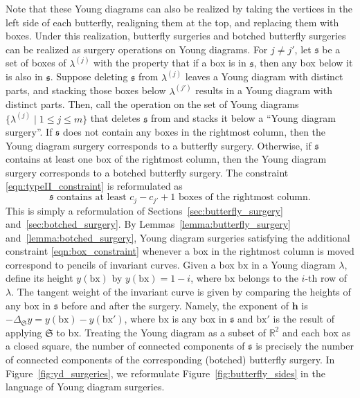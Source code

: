 \documentclass[pdftex]{sigma}
\numberwithin{equation}{section}
\newcommand{\RR}{\mathbb R}
\newcommand{\hb}{\mathbf h}
\newcommand{\site}{\mathfrak s}
\newcommand{\surgery}{\mathfrak S}
\newcommand{\bx}{\mathrm{bx}}
\begin{document}
Note that these Young diagrams can also be realized by taking the vertices in the left side of each butterfly, realigning them at the top, and replacing them with boxes. Under this realization, butterfly surgeries and botched butterfly surgeries can be realized as surgery operations on Young diagrams. For $j\neq j'$, let $\site$ be a set of boxes of $\lambda^{(j)}$ with the property that if a box is in $\site$, then any box below it is also in $\site$. Suppose deleting $\site$ from $\lambda^{(j)}$ leaves a Young diagram with distinct parts, and stacking those boxes below $\lambda^{(j')}$ results in a Young diagram with distinct parts. Then, call the operation on the set of Young diagrams $\big\{\lambda^{(j)} \mid 1\leq j \leq m\big\}$ that deletes $\site$ from  and stacks it below  a ``Young diagram surgery''. If $\site$ does not contain any boxes in the rightmost column, then the Young diagram surgery corresponds to a butterfly surgery. Otherwise, if $\site$ contains at least one box of the rightmost column, then the Young diagram surgery corresponds to a botched butterfly surgery. The constraint \eqref{eqn:typeII_constraint} is reformulated as
\begin{equation} \label{eqn:box_constraint}
\site\text{ contains at least }c_j - c_{j'} + 1\text{ boxes of the rightmost column.}
\end{equation}
This is simply a reformulation of Sections~\ref{sec:butterfly_surgery} and~\ref{sec:botched_surgery}. By Lemmas~\ref{lemma:butterfly_surgery} and~\ref{lemma:botched_surgery}, Young diagram surgeries satisfying the additional constraint \eqref{eqn:box_constraint} whenever a box in the rightmost column is moved correspond to pencils of invariant curves. Given a box $\bx$ in a Young diagram $\lambda$, define its height $y(\bx)$ by $y(\bx) = 1 - i$, where $\bx$ belongs to the $i$-th row of $\lambda$. The tangent weight of the invariant curve is given by comparing the heights of any box in $\site$ before and after the surgery. Namely, the exponent of $\hb$ is $-\Delta_\surgery y = y(\bx)-y(\bx')$, where $\bx$ is any box in $\site$ and $\bx'$ is the result of applying $\surgery$ to $\bx$. Treating the Young diagram as a subset of $\RR^2$ and each box as a closed square, the number of connected components of $\site$ is precisely the number of connected components of the corresponding (botched) butterfly surgery. In Figure~\ref{fig:yd_surgeries}, we reformulate Figure~\ref{fig:butterfly_sides} in the language of Young diagram surgeries.
\end{document}
